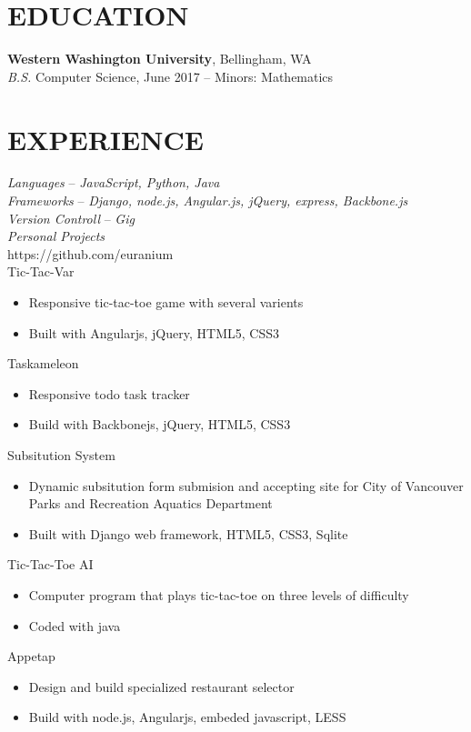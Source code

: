 \documentclass[line,margin]{res}
\begin{document}
\address{360.931.3237 $|$ rainierharvey@gmail.com $|$ https://rainierharvey.me $|$ github.com/euranium}

\begin{resume}
 
\section{EDUCATION}
	{\bf Western Washington University}, Bellingham, WA \\
	{\sl B.S.} Computer Science, {\small June 2017} -- Minors: Mathematics

\section{EXPERIENCE}

	{\sl Languages} -- {\sl JavaScript, Python, Java}\\
	{\sl Frameworks} -- {\sl Django, node.js, Angular.js, jQuery, express, Backbone.js} \\
	{\sl Version Controll} -- {\sl Gig}\\
	{\sl Personal Projects}\\
	{\footnotesize https://github.com/euranium}\\
	Tic-Tac-Var
	\begin{itemize} \itemsep -2pt
		\item Responsive tic-tac-toe game with several varients
		\item Built with Angularjs, jQuery, HTML5, CSS3
	\end{itemize}
	Taskameleon
	\begin{itemize} \itemsep -2pt
		\item Responsive todo task tracker
		\item Build with Backbonejs, jQuery, HTML5, CSS3 
	\end{itemize}
	Subsitution System
	\begin{itemize} \itemsep -2pt
		\item Dynamic subsitution form submision and accepting site for City of Vancouver Parks and Recreation Aquatics Department
		\item Built with Django web framework, HTML5, CSS3, Sqlite
	\end{itemize}
	Tic-Tac-Toe AI
	\begin{itemize} \itemsep -2pt
		\item Computer program that plays tic-tac-toe on three levels of difficulty
		\item Coded with java
	\end{itemize}
	Appetap
	\begin{itemize} \itemsep -2pt
		\item Design and build specialized restaurant selector 
		\item Build with node.js, Angularjs, embeded javascript, LESS
	\end{itemize}


\end{resume}
\end{document}
